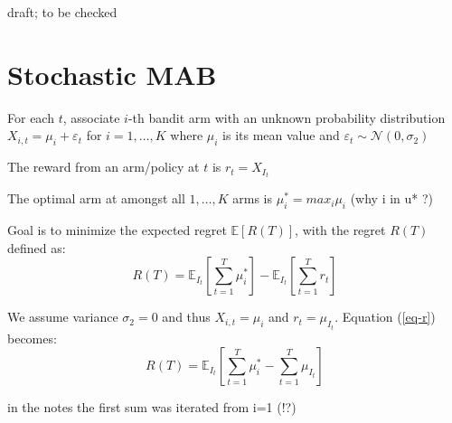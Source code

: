\documentclass[12pt,english]{article}
\begin{document}
draft; to be checked

\section{Stochastic MAB}

For each \(t\), associate \(i\)-th bandit arm with an unknown probability distribution \(X_{i,t} = \mu_i + \varepsilon_t\) for \(i=1,\dots,K\)  where \(\mu_i\) is its mean value and \(\varepsilon_t \sim \mathcal{N}\left( 0, \sigma_2 \right) \)

The reward from an arm/policy at \(t\) is \(r_t = X_{I_t}\)

The optimal arm at amongst all \(1,\dots,K\) arms is \(\mu_i^*=max_i\mu_i\) (why i in u* ?)

Goal is to minimize the expected regret \(\mathbb{E} \left[ R\left( T \right)  \right] \), with the regret \(R\left( T \right) \) defined as:
\begin{equation}\label{eq-r}
R\left( T \right) = \mathbb{E}_{I_t} \left[ \sum_{t=1}^{T} \mu_i^* \right] - \mathbb{E}_{I_t} \left[ \sum_{t=1}^T r_t\right]
\end{equation}

We assume variance \(\sigma_2 = 0\) and thus \(X_{i,t} = \mu_i\) and \(r_t = \mu_{I_t}\). Equation (\ref{eq-r}) becomes:
\begin{equation}\label{eq-r-novar}
	R\left( T \right) = \mathbb{E}_{I_t} \left[ \sum_{t=1}^{T} \mu_i^* - \sum_{t=1}^T \mu_{I_t} \right]
\end{equation}

in the notes the first sum was iterated from i=1 (!?)
\end{document}
